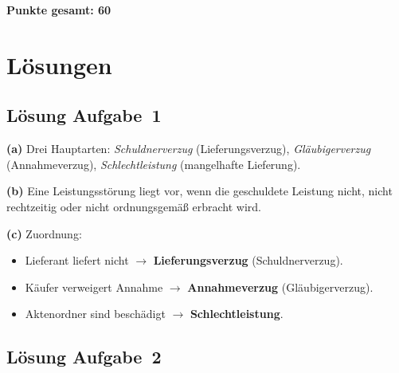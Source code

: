 \documentclass[11pt, a4paper]{article}
\begin{document}
\vspace{1em}
\noindent\textbf{Punkte gesamt: 60}

\newpage

\section{Lösungen}\label{loesungen}

\subsection*{Lösung Aufgabe~1}

\begin{loesung}
\textbf{(a)} Drei Hauptarten: \emph{Schuldnerverzug} (Lieferungsverzug), \emph{Gläubigerverzug} (Annahmeverzug), \emph{Schlechtleistung} (mangelhafte Lieferung).

\textbf{(b)} Eine Leistungsstörung liegt vor, wenn die geschuldete Leistung nicht, nicht rechtzeitig oder nicht ordnungsgemäß erbracht wird.

\textbf{(c)} Zuordnung:
\begin{itemize}[itemsep=0pt]
  \item Lieferant liefert nicht $\to$ \textbf{Lieferungsverzug} (Schuldnerverzug).
  \item Käufer verweigert Annahme $\to$ \textbf{Annahmeverzug} (Gläubigerverzug).
  \item Aktenordner sind beschädigt $\to$ \textbf{Schlechtleistung}.
\end{itemize}
\end{loesung}

\subsection*{Lösung Aufgabe~2}
\end{document}
